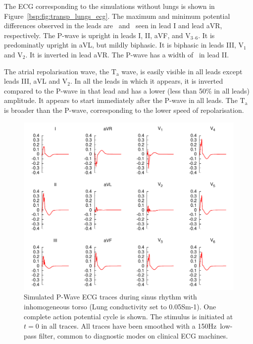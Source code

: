The ECG corresponding to the simulations without lungs is shown in
Figure~\ref{bsp:fig:transp_lungs_ecg}.
The maximum and minimum potential differences observed in the leads are
\ and \ seen in lead I and lead aVR, respectively.
The P-wave is upright in leads I, II, aVF, and $\text{V}_{\text{3--6}}$.
It is predominatly upright in aVL, but mildly biphasic.
It is biphasic in leads III, $\text{V}_{\text{1}}$ and $\text{V}_{\text{2}}$.
It is inverted in lead aVR.
The P-wave has a width of \ in lead II.

The atrial repolarisation wave, the $\text{T}_{\text{a}}$ wave, is easily
visible in all leads except leads III, aVL and $\text{V}_{\text{2}}$.
In all the leads in which it appears, it is inverted compared to the P-wave in
that lead and has a lower (less than 50\% in all leads) amplitude.
It appears to start immediately after the P-wave in all leads.
The $\text{T}_{\text{a}}$ is broader than the P-wave, corresponding to the lower
speed of repolarisation.

\begin{figure}
\includegraphics{figures/bsp/ecg_lungs_150Hz}
\caption[12 lead ECG during sinus rhythm with inhomogeneous torso]{
\label{bsp:fig:lungs_ecg}
Simulated P-Wave ECG traces during sinus rhythm with inhomogeneous torso (Lung
conductivity set to 0.05Sm-1).
One complete action potential cycle is shown.
The stimulus is initiated at $t = 0$ in all traces.
All traces have been smoothed with a \unit{150}{Hz}\ low-pass filter, common to
diagnostic modes on clinical ECG machines.
}
\end{figure}

